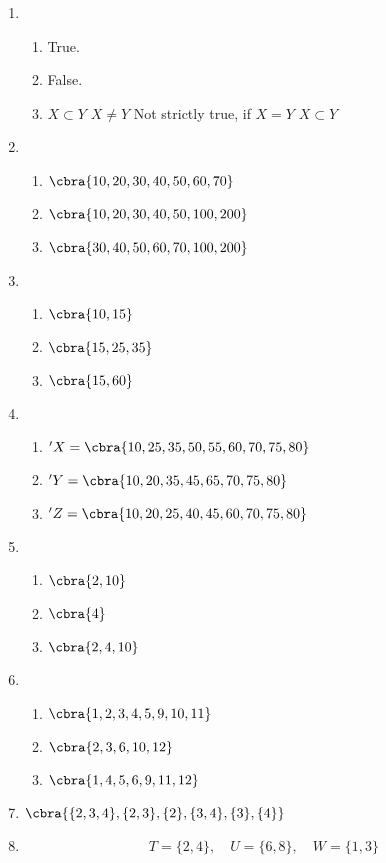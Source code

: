 \documentclass{article}
\begin{document}
\begin{enumerate}
	\item \begin{enumerate}
			\item True. 
			\item False.
			\item $X\subset Y$ $X\ne Y$ Not strictly true, if $X=Y$ $X\subset Y$
		\end{enumerate}
	\item \begin{enumerate}
			\item $\cbra{10, 20, 30, 40, 50, 60, 70} $
			\item $\cbra{10, 20, 30, 40, 50, 100, 200}$
			\item $\cbra{30, 40, 50, 60, 70, 100, 200}$
		\end{enumerate}
	\item \begin{enumerate}
			\item $\cbra{10, 15}$
			\item $\cbra{15, 25, 35}$
			\item $\cbra{15, 60}$
		\end{enumerate}
	\item \begin{enumerate}
			\item $'X=\cbra{10, 25, 35, 50, 55, 60, 70, 75, 80}$
			\item $'Y=\cbra{10, 20, 35, 45, 65, 70, 75, 80}$
			\item $'Z=\cbra{10, 20, 25, 40, 45, 60, 70, 75, 80}$
		\end{enumerate}
	\item \begin{enumerate}
			\item $\cbra{2, 10}$
			\item $\cbra{4}$
			\item $\cbra{2, 4, 10}$
		\end{enumerate}
	\item \begin{enumerate}
			\item $\cbra{1, 2, 3, 4, 5, 9, 10, 11}$
			\item $\cbra{2, 3, 6, 10, 12}$
			\item $\cbra{1, 4, 5, 6, 9, 11, 12}$
	\end{enumerate}
    \item $\cbra{\{2, 3, 4\},\{2, 3\}, \{2\}, \{3, 4\}, \{3\}, \{4\}}$	
	\item 
\[
T = \{2, 4\}, \quad U = \{6, 8\}, \quad W = \{1, 3\}
\]


\end{enumerate}
\end{document}
